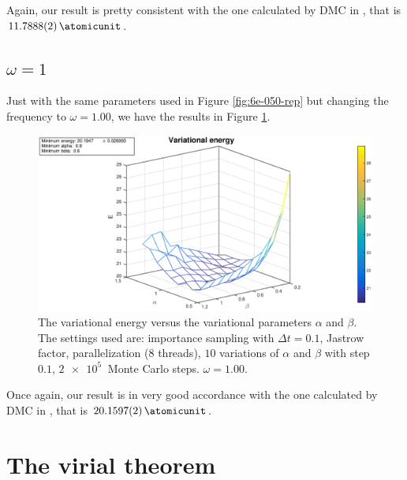 \documentclass[a4paper,twoside,11pt]{book}
\begin{document}
Again, our result is pretty consistent with the one calculated by DMC in \cite{pede}, that is $\SI{11.7888 \pm 0.0002}{\atomicunit}$.

\section{$\omega = 1$}

Just with the same parameters used in Figure \ref{fig:6e-050-rep} but changing the frequency to $\omega=1.00$, we have the results in Figure \ref{fig:6e-100-rep}.
\begin{figure}[H]
	\centering
	\includegraphics[width=\textwidth]{6e-100-rep}
	\caption{The variational energy versus the variational parameters $\alpha$ and $\beta$. The settings used are: importance sampling with $\Delta t = 0.1$, Jastrow factor, parallelization (8 threads), $10$ variations of $\alpha$ and $\beta$ with step $0.1$, $\SI{2e5}{}$ Monte Carlo steps. $\omega=1.00$.}
	\label{fig:6e-100-rep}
\end{figure}

Once again, our result is in very good accordance with the one calculated by DMC in \cite{pede}, that is $\SI{20.1597 \pm 0.0002}{\atomicunit}$.




\chapter{The virial theorem}
\label{sec:virial}
\end{document}
